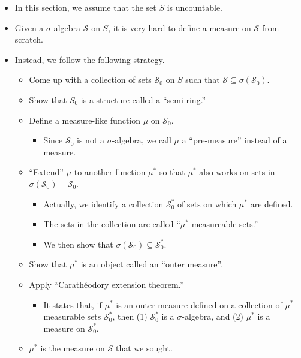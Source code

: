 \documentclass[10pt]{article}
\numberwithin{lemma}{section}
\newcommand{\mcal}[1]{\mathcal{#1}}
\begin{document}
\begin{itemize}
  \item In this section, we assume that the set $S$ is uncountable.
  
  \item Given a $\sigma$-algebra $\mcal{S}$ on $S$, it is very hard to define a measure on $\mcal{S}$ from scratch.
  
  \item Instead, we follow the following strategy.
  \begin{itemize}
    \item Come up with a collection of sets $\mcal{S}_0$ on $S$ such that $\mcal{S} \subseteq \sigma(\mcal{S}_0)$.
    \item Show that $S_0$ is a structure called a ``semi-ring.''
    \item Define a measure-like function $\mu$ on $\mcal{S}_0$.
    \begin{itemize}
      \item Since $\mcal{S}_0$ is not a $\sigma$-algebra, we call $\mu$ a ``pre-measure'' instead of a measure.
    \end{itemize}
    \item ``Extend'' $\mu$ to another function $\mu^*$ so that $\mu^*$ also works on sets in $\sigma(\mcal{S}_0) - \mcal{S}_0$.
    \begin{itemize}
      \item Actually, we identify a collection $\mcal{S}_0^*$ of sets on which $\mu^*$ are defined. 
      \item The sets in the collection are called ``$\mu^*$-measureable sets.''
      \item We then show that $\sigma(\mcal{S}_0) \subseteq \mcal{S}_0^*$.
    \end{itemize}
    \item Show that $\mu^*$ is an object called an ``outer measure''.
    \item Apply ``Carath\'{e}odory extension theorem.''
    \begin{itemize}
      \item It states that, if $\mu^*$ is an outer measure defined on a collection of $\mu^*$-measurable sets $\mcal{S}^*_0$, then
      (1) $\mcal{S}_0^*$ is a $\sigma$-algebra, and 
      (2) $\mu^*$ is a measure on $\mcal{S}_0^*$. 
    \end{itemize}
    \item $\mu^*$ is the measure on $\mcal{S}$ that we sought.
  \end{itemize}


\end{itemize}
\end{document}
